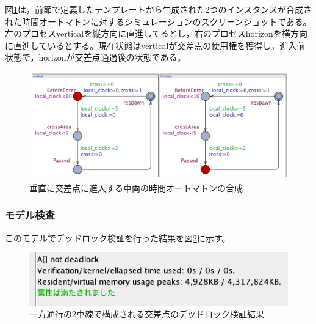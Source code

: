 \documentclass{tpu-sotu}
\begin{document}
	図\ref{PerpendicularS}は，前節で定義したテンプレートから生成された2つのインスタンスが合成された時間オートマトンに対するシミュレーションのスクリーンショットである。左のプロセスverticalを縦方向に直進してるとし，右のプロセスhorizonを横方向に直進しているとする。現在状態はverticalが交差点の使用権を獲得し，進入前状態で，horizonが交差点通過後の状態である。
	\begin{figure}[htbp]
	\centering
	\includegraphics[width=130mm]{PerpendicularSimu.png}
	\caption{垂直に交差点に進入する車両の時間オートマトンの合成}
	\label{PerpendicularS}
	\end{figure}
	
	\subsubsection{モデル検査}
	このモデルでデッドロック検証を行った結果を図\ref{PerV}に示す。
	\begin{figure}[htbp]
	\centering
	\includegraphics[width=120mm]{PerV.png}
	\caption{一方通行の2車線で構成される交差点のデッドロック検証結果}
	\label{PerV}
	\end{figure}
	
\end{document}
